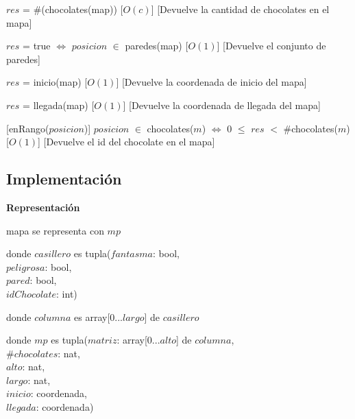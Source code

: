 \documentclass[10pt, a4paper]{article}
\begin{document}
\begin{Interfaz}
            {$res$ = \#(chocolates(map))}%
            [$O(c)$]
            [Devuelve la cantidad de chocolates en el mapa]

            {$res$ = true $\iff$ $posicion$ $\in$ paredes(map)}%
            [$O(1)$]
            [Devuelve el conjunto de paredes]

            {$res$ = inicio(map)}%
            [$O(1)$]
            [Devuelve la coordenada de inicio del mapa]

            {$res$ = llegada(map)}%
            [$O(1)$]
            [Devuelve la coordenada de llegada del mapa]

            \newpage

            [enRango($posicion$)]
            {$posicion$ $\in$ chocolates($m$) $\iff$ $0$ $\leq$ $res$ $<$ \#chocolates($m$)}%
            [$O(1)$]
            [Devuelve el id del chocolate en el mapa]

    \end{Interfaz}

    \newpage

    \subsection*{Implementación}

    \textbf{Representación}

    mapa se representa con $mp$

    donde $casillero$ es tupla($fantasma$: bool, \\
        \text{}\qquad\quad $peligrosa$: bool, \\
        \text{}\qquad\quad $pared$: bool, \\
        \text{}\qquad\quad $idChocolate$: int)

    donde $columna$ es array[0...$largo$] de $casillero$

    donde $mp$ es tupla($matriz$: array[0...$alto$] de $columna$, \\
        \text{}\qquad\quad \#$chocolates$: nat, \\
        \text{}\qquad\quad $alto$: nat, \\
        \text{}\qquad\quad $largo$: nat, \\
        \text{}\qquad\quad $inicio$: coordenada, \\
        \text{}\qquad\quad $llegada$: coordenada)
\end{document}
